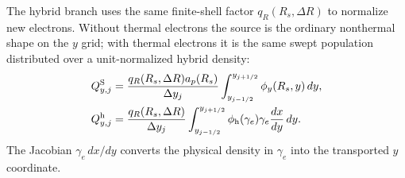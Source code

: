 \documentclass[twocolumn]{aastex702}
\begin{document}
The hybrid branch uses the same finite-shell factor \(q_R(R_s,\Delta R)\) to
normalize new electrons.  Without thermal electrons the source is the ordinary
nonthermal shape on the \(y\) grid; with thermal electrons it is the same swept
population distributed over a unit-normalized hybrid density:
\begin{equation}
\begin{aligned}
Q_{y,j}^{\rm S}&=
\frac{q_R(R_s,\Delta R)a_p(R_s)}{\Delta y_j}
\int_{y_{j-1/2}}^{y_{j+1/2}}\phi_y(R_s,y)\,dy,\\
Q_{y,j}^{\rm h}&=
\frac{q_R(R_s,\Delta R)}{\Delta y_j}
\int_{y_{j-1/2}}^{y_{j+1/2}}
\phi_{\rm h}(\gamma_e)\gamma_e\frac{dx}{dy}\,dy .
\end{aligned}
\end{equation}
The Jacobian \(\gamma_e\,dx/dy\) converts the physical density in
\(\gamma_e\) into the transported \(y\) coordinate.
\end{document}
